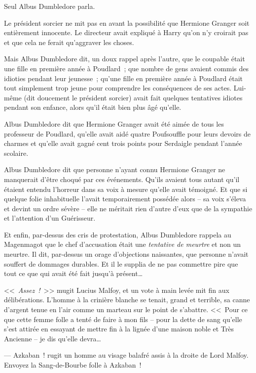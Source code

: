 Seul Albus Dumbledore parla.

Le président sorcier ne mit pas en avant la possibilité que Hermione Granger soit entièrement innocente. Le directeur avait expliqué à Harry qu'on n'y croirait pas et que cela ne ferait qu'aggraver les choses.

Mais Albus Dumbledore dit, un doux rappel après l'autre, que le coupable était une fille en première année à Poudlard~; que nombre de gens avaient commis des idioties pendant leur jeunesse~; qu'une fille en première année à Poudlard était tout simplement trop jeune pour comprendre les conséquences de ses actes. Lui-même (dit doucement le président sorcier) avait fait quelques tentatives idiotes pendant son enfance, alors qu'il était bien plus âgé qu'elle.

Albus Dumbledore dit que Hermione Granger avait été aimée de tous les professeur de Poudlard, qu'elle avait aidé quatre Poufsouffle pour leurs devoirs de charmes et qu'elle avait gagné cent trois points pour Serdaigle pendant l'année scolaire.

Albus Dumbledore dit que personne n'ayant connu Hermione Granger ne manquerait d'être choqué par ces événements. Qu'ils avaient tous autant qu'il étaient entendu l'horreur dans sa voix à mesure qu'elle avait témoigné. Et que si quelque folie inhabituelle l'avait temporairement possédée alors -- sa voix s'éleva et devint un ordre sévère -- elle ne méritait rien d'autre d'eux que de la sympathie et l'attention d'un Guérisseur.

Et enfin, par-dessus des cris de protestation, Albus Dumbledore rappela au Magenmagot que le chef d'accusation était une \emph{tentative de meurtre} et non un meurtre. Il dit, par-dessus un orage d'objections naissantes, que personne n'avait souffert de dommages durables. Et il le supplia de ne pas commettre pire que tout ce que qui avait été fait jusqu'à présent…

<<~\emph{Assez~!}~>> mugit Lucius Malfoy, et un vote à main levée mit fin aux délibérations. L'homme à la crinière blanche se tenait, grand et terrible, sa canne d'argent tenue en l'air comme un marteau sur le point de s'abattre. <<~Pour ce que cette femme folle a tenté de faire à mon fils -- pour la dette de sang qu'elle s'est attirée en essayant de mettre fin à la lignée d'une maison noble et Très Ancienne -- je dis qu'elle devra…

--- Azkaban~! rugit un homme au visage balafré assis à la droite de Lord Malfoy. Envoyez la Sang-de-Bourbe folle à Azkaban~!

